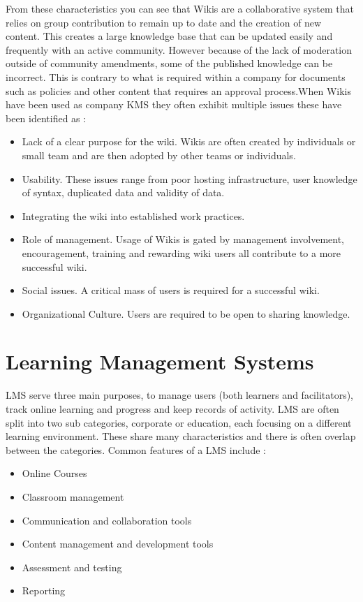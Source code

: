 From these characteristics you can see that Wikis are a collaborative system that relies on group contribution to remain up to date and the creation of new content. This creates a large knowledge base that can be updated easily and frequently with  an active community. However because of the lack of moderation outside of community amendments, some of the published knowledge can be incorrect. This is contrary to what is required within a company for documents such as policies and other content that requires an approval process.When Wikis have been used as company KMS they often exhibit multiple issues these have been identified as \cite{kiniti2013wikis}:

\begin{itemize}
\item Lack of a clear purpose for the wiki. Wikis are often created by individuals or small team and are then adopted by other teams or individuals.
\item Usability. These issues range from poor hosting infrastructure, user knowledge of syntax, duplicated data and validity of data.
\item Integrating the wiki into established work practices. 
\item Role of management. Usage of Wikis is gated by management involvement, encouragement, training and rewarding wiki users all contribute to a more successful wiki.
\item Social issues. A critical mass of users is required for a successful wiki.
\item Organizational Culture. Users are required to be open to sharing knowledge.
\end{itemize}

\section{Learning Management Systems}
LMS serve three main purposes, to manage users (both learners and facilitators), track online learning and progress and keep records of activity. LMS are often split into two sub categories, corporate or education, each focusing on a different learning environment. These share many characteristics and there is often overlap between the categories. Common features of a LMS include \cite{mcintosh2014vendors}:

\begin{itemize}
\item Online Courses
\item Classroom management
\item Communication and collaboration tools
\item Content management and development tools
\item Assessment and testing
\item Reporting
\end{itemize}


